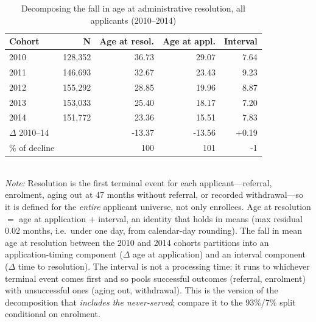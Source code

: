 \begin{table}[htbp]\centering
\caption{Decomposing the fall in age at administrative resolution, all applicants (2010--2014)}
\label{tab:P55res}
\footnotesize
\setlength{\tabcolsep}{5pt}
\begin{tabular}{lrrrr}
\toprule
Cohort & N & Age at resol. & Age at appl. & Interval \\
\midrule
2010 & 128,352 & 36.73 & 29.07 & 7.64 \\
2011 & 146,693 & 32.67 & 23.43 & 9.23 \\
2012 & 155,292 & 28.85 & 19.96 & 8.87 \\
2013 & 153,033 & 25.40 & 18.17 & 7.20 \\
2014 & 151,772 & 23.36 & 15.51 & 7.83 \\
\midrule
$\Delta$ 2010--14 &  & -13.37 & -13.56 & +0.19 \\
\% of decline &  & 100 & 101 & -1 \\
\bottomrule
\end{tabular}
\\[3pt]{\footnotesize \textit{Note:} Resolution is the first terminal event for each applicant---referral, enrolment, aging out at 47 months without referral, or recorded withdrawal---so it is defined for the \emph{entire} applicant universe, not only enrollees. Age at resolution $=$ age at application $+$ interval, an identity that holds in means (max residual $0.02$ months, i.e.\ under one day, from calendar-day rounding). The fall in mean age at resolution between the 2010 and 2014 cohorts partitions into an application-timing component ($\Delta$ age at application) and an interval component ($\Delta$ time to resolution). The interval is not a processing time: it runs to whichever terminal event comes first and so pools successful outcomes (referral, enrolment) with unsuccessful ones (aging out, withdrawal). This is the version of the decomposition that \emph{includes the never-served}; compare it to the 93\%/7\% split conditional on enrolment.}
\end{table}

